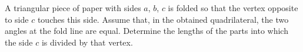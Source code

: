 \problem{}
A triangular piece of paper with sides $a$, $b$, $c$ is folded so that the
vertex opposite to side $c$ touches this side.
Assume that, in the obtained quadrilateral, the two angles at the fold line are
equal.
Determine the lengths of the parts into which the side $c$ is divided by that
vertex.
\solution
\endproblem
